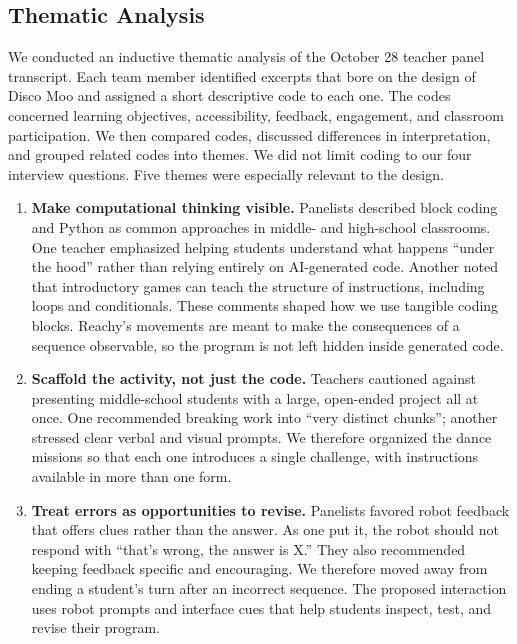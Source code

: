 \documentclass[conference]{IEEEtran}
\begin{document}
\subsection{Thematic Analysis}

We conducted an inductive thematic analysis of the October 28 teacher panel transcript. Each team member identified excerpts that bore on the design of Disco Moo and assigned a short descriptive code to each one. The codes concerned learning objectives, accessibility, feedback, engagement, and classroom participation. We then compared codes, discussed differences in interpretation, and grouped related codes into themes. We did not limit coding to our four interview questions. Five themes were especially relevant to the design.

\begin{enumerate}
    \item \textbf{Make computational thinking visible.} Panelists described block coding and Python as common approaches in middle- and high-school classrooms. One teacher emphasized helping students understand what happens ``under the hood'' rather than relying entirely on AI-generated code. Another noted that introductory games can teach the structure of instructions, including loops and conditionals. These comments shaped how we use tangible coding blocks. Reachy's movements are meant to make the consequences of a sequence observable, so the program is not left hidden inside generated code.

    \item \textbf{Scaffold the activity, not just the code.} Teachers cautioned against presenting middle-school students with a large, open-ended project all at once. One recommended breaking work into ``very distinct chunks''; another stressed clear verbal and visual prompts. We therefore organized the dance missions so that each one introduces a single challenge, with instructions available in more than one form.

    \item \textbf{Treat errors as opportunities to revise.} Panelists favored robot feedback that offers clues rather than the answer. As one put it, the robot should not respond with ``that's wrong, the answer is X.'' They also recommended keeping feedback specific and encouraging. We therefore moved away from ending a student's turn after an incorrect sequence. The proposed interaction uses robot prompts and interface cues that help students inspect, test, and revise their program.


\end{enumerate}
\end{document}
